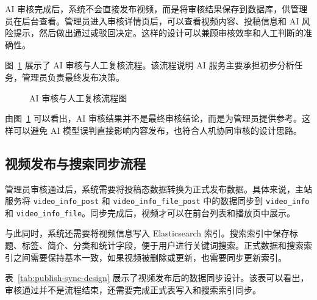AI 审核完成后，系统不会直接发布视频，而是将审核结果保存到数据库，供管理员在后台查看。管理员进入审核详情页后，可以查看视频内容、投稿信息和 AI 风险提示，然后做出通过或驳回决定。这样的设计可以兼顾审核效率和人工判断的准确性。

图~\ref{fig:audit-process-design} 展示了 AI 审核与人工复核流程。该流程说明 AI 服务主要承担初步分析任务，管理员负责最终发布决策。

\begin{figure}[htbp]
  \centering
  \caption{AI 审核与人工复核流程图}
  \label{fig:audit-process-design}
\end{figure}

由图~\ref{fig:audit-process-design} 可以看出，AI 审核结果并不是最终审核结论，而是为管理员提供参考。这样可以避免 AI 模型误判直接影响内容发布，也符合人机协同审核的设计思路。

\subsection{视频发布与搜索同步流程}
\label{subsec:publish-search-sync-process}

管理员审核通过后，系统需要将投稿态数据转换为正式发布数据。具体来说，主站服务将 \texttt{video\_info\_post} 和 \texttt{video\_info\_file\_post} 中的数据同步到 \texttt{video\_info} 和 \texttt{video\_info\_file}。同步完成后，视频才可以在前台列表和播放页中展示。

与此同时，系统还需要将视频信息写入 Elasticsearch 索引。搜索索引中保存标题、标签、简介、分类和统计字段，便于用户进行关键词搜索。正式数据和搜索索引之间需要保持基本一致，如果视频被删除或更新，也需要同步更新索引。

表~\ref{tab:publish-sync-design} 展示了视频发布后的数据同步设计。该表可以看出，审核通过并不是流程结束，还需要完成正式表写入和搜索索引同步。

